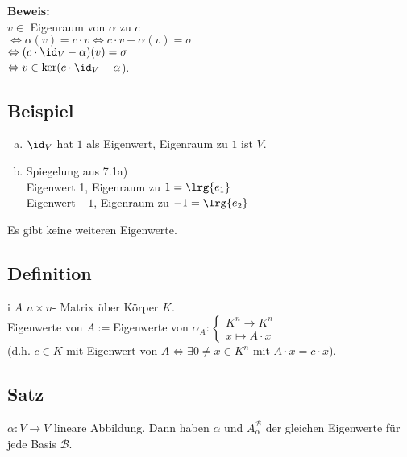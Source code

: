   \textbf{Beweis:}\\
  $v\in$ Eigenraum von $\alpha$ zu $c$\\
  $\Leftrightarrow\alpha(v)=c\cdot v\Leftrightarrow c\cdot
  v-\alpha(v)=\sigma$\\
  $\Leftrightarrow(c\cdot\id_V-\alpha)(v)=\sigma$\\
  $\Leftrightarrow v\in\mbox{ker}(c\cdot\id_V-\alpha$).

\subsection{Beispiel}
  \begin{enumerate}[a)]
    \item $\id_V$ hat $1$ als Eigenwert, Eigenraum zu $1$ ist $V$.
    \item Spiegelung aus 7.1a)\\
      Eigenwert 1, Eigenraum zu $1=\lrg{e_1}$\\
      Eigenwert $-1$, Eigenraum zu $-1=\lrg{e_2}$
  \end{enumerate}

  Es gibt keine weiteren Eigenwerte.

\subsection{Definition}
  i $A$ $n\times n$- Matrix über Körper $K$.\\
  Eigenwerte von $A:=$Eigenwerte von $\alpha_A:\begin{cases}K^n\rightarrow
  K^n\\ x\mapsto A\cdot x\end{cases}$\\
  (d.h. $c\in K$ mit Eigenwert von $A\Leftrightarrow\exists 0\neq x\in K^n$ mit
  $A\cdot x=c\cdot x$).

\subsection{Satz}
  $\alpha: V\rightarrow V$ lineare Abbildung. Dann haben $\alpha$ und
  $A_\alpha^{\mathcal{B}}$ der gleichen Eigenwerte für jede Basis ${\mathcal{B}}$.

